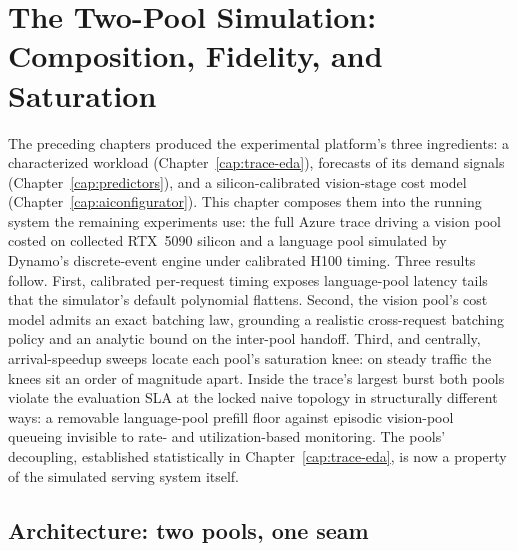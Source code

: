 \chapter{The Two-Pool Simulation: Composition, Fidelity, and Saturation}
\label{cap:twopool}

The preceding chapters produced the experimental platform's three
ingredients: a characterized workload
(Chapter~\ref{cap:trace-eda}), forecasts of its demand signals
(Chapter~\ref{cap:predictors}), and a silicon-calibrated vision-stage
cost model (Chapter~\ref{cap:aiconfigurator}). This chapter composes them
into the running system the remaining experiments use: the full Azure trace
driving a vision pool costed on collected RTX~5090 silicon and a language
pool simulated by Dynamo's discrete-event engine under calibrated H100
timing. Three results follow. First, calibrated per-request timing
exposes language-pool latency tails that the
simulator's default polynomial flattens. Second, the vision pool's cost
model admits an exact batching law, grounding a realistic cross-request
batching policy and an analytic bound on the inter-pool handoff. Third,
and centrally, arrival-speedup sweeps locate each pool's saturation
knee: on steady traffic the knees sit an order of magnitude apart.
Inside the trace's largest burst both pools violate the evaluation SLA
at the locked naive topology in structurally different ways: a
removable language-pool prefill floor against episodic vision-pool
queueing invisible to rate- and utilization-based monitoring. The pools' decoupling,
established statistically in Chapter~\ref{cap:trace-eda}, is now a
property of the simulated serving system itself.

\section{Architecture: two pools, one seam}
\label{sec:sim-arch}

